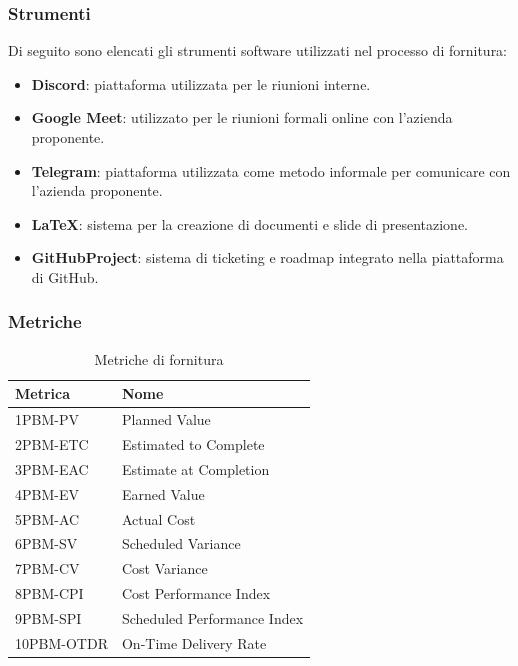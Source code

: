 \subsubsection{Strumenti}
Di seguito sono elencati gli strumenti software utilizzati nel processo di fornitura:
\begin{itemize}
    \item \textbf{Discord}: piattaforma utilizzata per le riunioni interne.
    \item \textbf{Google Meet}: utilizzato per le riunioni formali online con l'azienda proponente.
    \item \textbf{Telegram}: piattaforma utilizzata come metodo informale per comunicare con l'azienda proponente.
    \item \textbf{LaTeX}: sistema per la creazione di documenti e slide di presentazione.
    \item \textbf{GitHubProject}: sistema di ticketing e roadmap integrato nella piattaforma di GitHub. 
\end{itemize}

\subsubsection{Metriche}
\begin{table}[h!]
    \centering
    \renewcommand{\arraystretch}{1.5}
    \begin{tabular}{|>{\centering\arraybackslash}m{5cm}|>{\centering\arraybackslash}m{5cm}|}
        \hline
        \textbf{Metrica} & \textbf{Nome} \\
        \hline
        1PBM-PV & Planned Value \\
        \hline
        2PBM-ETC & Estimated to Complete \\
        \hline
        3PBM-EAC & Estimate at Completion \\
        \hline
        4PBM-EV & Earned Value \\
        \hline
        5PBM-AC & Actual Cost \\
        \hline
        6PBM-SV & Scheduled Variance \\
        \hline
        7PBM-CV & Cost Variance \\
        \hline
        8PBM-CPI & Cost Performance Index \\
        \hline
        9PBM-SPI & Scheduled Performance Index \\
        \hline
        10PBM-OTDR & On-Time Delivery Rate \\
        \hline
    \end{tabular}
    \caption{Metriche di fornitura}
    \label{tab:metriche}
\end{table}






